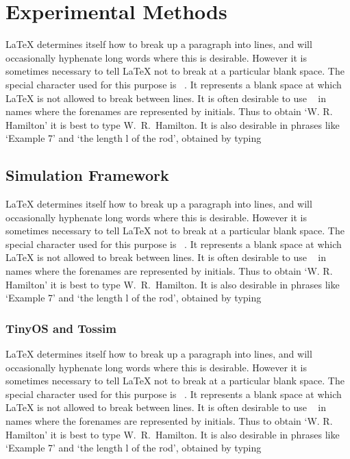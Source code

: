 \documentclass[12pt]{report}
\begin{document}
\chapter{Experimental Methods}

LaTeX determines itself how to break up a paragraph into lines, and will occasionally hyphenate long words where this is desirable. However it is sometimes necessary to tell LaTeX not to break at a particular blank space. The special character used for this purpose is ~. It represents a blank space at which LaTeX is not allowed to break between lines. It is often desirable to use ~ in names where the forenames are represented by initials. Thus to obtain `W. R. Hamilton' it is best to type W.~R.~Hamilton. It is also desirable in phrases like `Example 7' and `the length l of the rod', obtained by typing



\section{Simulation Framework}

LaTeX determines itself how to break up a paragraph into lines, and will occasionally hyphenate long words where this is desirable. However it is sometimes necessary to tell LaTeX not to break at a particular blank space. The special character used for this purpose is ~. It represents a blank space at which LaTeX is not allowed to break between lines. It is often desirable to use ~ in names where the forenames are represented by initials. Thus to obtain `W. R. Hamilton' it is best to type W.~R.~Hamilton. It is also desirable in phrases like `Example 7' and `the length l of the rod', obtained by typing



\subsection{TinyOS and Tossim}

LaTeX determines itself how to break up a paragraph into lines, and will occasionally hyphenate long words where this is desirable. However it is sometimes necessary to tell LaTeX not to break at a particular blank space. The special character used for this purpose is ~. It represents a blank space at which LaTeX is not allowed to break between lines. It is often desirable to use ~ in names where the forenames are represented by initials. Thus to obtain `W. R. Hamilton' it is best to type W.~R.~Hamilton. It is also desirable in phrases like `Example 7' and `the length l of the rod', obtained by typing
\end{document}
